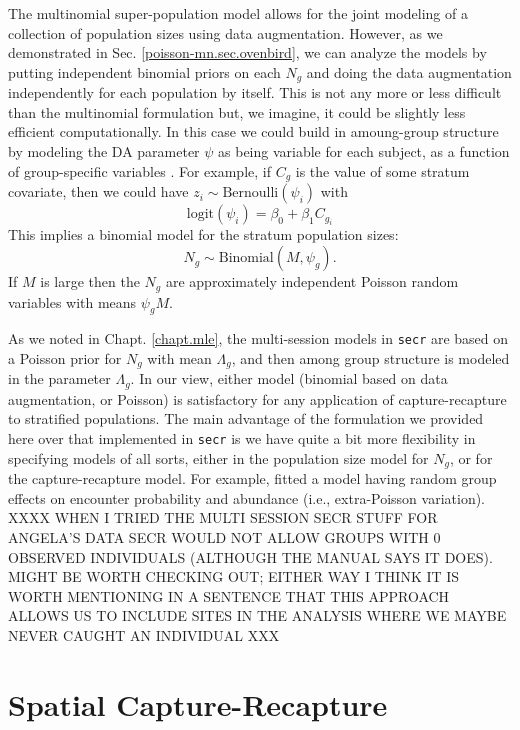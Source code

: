 The multinomial super-population model allows for the joint modeling of a collection of
population sizes using data augmentation.  However, as we demonstrated
in Sec. \ref{poisson-mn.sec.ovenbird}, we can analyze the models by
putting independent binomial priors on each $N_{g}$ and doing the data
augmentation independently for each population by itself.  This is not
any more or less difficult than the multinomial formulation but, we
imagine, it could be slightly less efficient computationally.  In this
case we could build in amoung-group structure by modeling the DA
parameter $\psi$ as being variable for each subject, as a function of
group-specific variables \citep[see][for an
example]{hendriks_etal:2013}.  For example, if $C_{g}$ is the value of
some stratum covariate, then we could have $z_{i} \sim
\mbox{Bernoulli}( \psi_{i})$ with
\[
 \mbox{logit}(\psi_{i}) = \beta_0 + \beta_1  C_{g_{i}}
\]
This implies a binomial model for the stratum population sizes:
\[
N_{g} \sim \mbox{Binomial}(M, \psi_{g}).
\]  
If $M$ is large then the $N_{g}$ are approximately
independent Poisson random variables with means $\psi_{g} M$.

As we noted in Chapt. \ref{chapt.mle}, 
the multi-session models in \mbox{\tt secr}  are based on a
Poisson prior for $N_{g}$ with mean $\Lambda_{g}$, and then among group structure is modeled in
the parameter $\Lambda_{g}$. In our view, either model (binomial
based on data augmentation, or Poisson) is satisfactory for any
application of capture-recapture to stratified populations.  
The main advantage of the formulation we provided here over that
implemented in \mbox{\tt secr} is we have quite a bit more flexibility
in specifying models of all sorts, either in the population size model
for $N_{g}$, or for the capture-recapture model. For example,
\citet{royle_converse:2013} fitted a model having random group effects
on encounter probability and abundance (i.e., extra-Poisson
variation). 
XXXX WHEN I TRIED THE MULTI SESSION SECR STUFF FOR ANGELA'S DATA SECR WOULD NOT ALLOW GROUPS WITH 0 OBSERVED INDIVIDUALS (ALTHOUGH THE MANUAL SAYS IT DOES). MIGHT BE WORTH CHECKING OUT; EITHER WAY I THINK IT IS WORTH MENTIONING IN A SENTENCE THAT THIS APPROACH ALLOWS US TO INCLUDE SITES IN THE ANALYSIS WHERE WE MAYBE NEVER CAUGHT AN INDIVIDUAL XXX

\section{Spatial Capture-Recapture}


